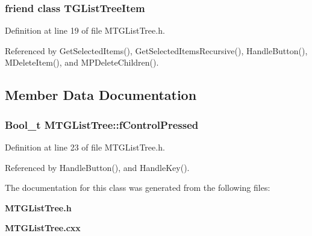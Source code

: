 \subsubsection[{TGListTreeItem}]{\setlength{\rightskip}{0pt plus 5cm}friend class TGListTreeItem\hspace{0.3cm}{\ttfamily  [friend]}}\label{classMTGListTree_a5bda0cb7f07902080ed935fa1cd8d941}


Definition at line 19 of file MTGListTree.h.

Referenced by GetSelectedItems(), GetSelectedItemsRecursive(), HandleButton(), MDeleteItem(), and MPDeleteChildren().

\subsection{Member Data Documentation}
\subsubsection[{fControlPressed}]{\setlength{\rightskip}{0pt plus 5cm}Bool\_\-t {\bf MTGListTree::fControlPressed}\hspace{0.3cm}{\ttfamily  [private]}}\label{classMTGListTree_a5387e77c9a8fe1512d400294a8e8714f}


Definition at line 23 of file MTGListTree.h.

Referenced by HandleButton(), and HandleKey().

The documentation for this class was generated from the following files:\begin{DoxyCompactItemize}
\item 
{\bf MTGListTree.h}\item 
{\bf MTGListTree.cxx}\end{DoxyCompactItemize}
